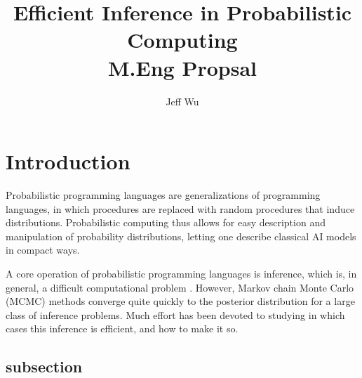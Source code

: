 \documentclass[11pt]{article}
\begin{document}
\title{{\bf Efficient Inference in Probabilistic Computing} \\ M.Eng Propsal}
\author{Jeff Wu}
\date{}
\maketitle
%




\begin{abstract}
\end{abstract}

\section{Introduction}

Probabilistic programming languages are generalizations of programming languages, in which procedures are replaced with random procedures that induce distributions.  Probabilistic computing thus allows for easy description and manipulation of probability distributions, letting one describe classical AI models in compact ways.  

A core operation of probabilistic programming languages is inference, which is, in general, a difficult computational problem \cite{?}.  However, Markov chain Monte Carlo (MCMC) methods converge quite quickly to the posterior distribution for a large class of inference problems.  Much effort has been devoted to studying in which cases this inference is efficient, and how to make it so.  






\subsection{subsection}
\end{document}
